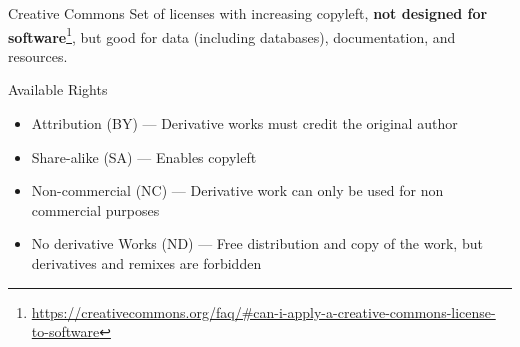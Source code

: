 \documentclass[presentation]{beamer}
\newcommand{\fnurl}[1]{\footnote{\url{#1}}}
\begin{document}
\begin{frame}{Creative Commons}
    Set of licenses with increasing copyleft, \textbf{not designed for software}\fnurl{https://creativecommons.org/faq/\#can-i-apply-a-creative-commons-license-to-software}, but good for data (including databases), documentation, and resources.
    \begin{block}{Available Rights}
        \begin{itemize}
            \item Attribution (BY) --- Derivative works must credit the original author
            \item Share-alike (SA) --- Enables copyleft
            \item Non-commercial (NC) --- Derivative work can only be used for non commercial purposes
            \item No derivative Works (ND) --- Free distribution and copy of the work, but derivatives and remixes are forbidden
        \end{itemize}
    \end{block}
\end{frame}
\end{document}
